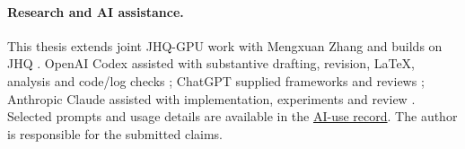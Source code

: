 \paragraph*{Research and AI assistance.}
\label{front:provenance}
This thesis extends joint JHQ-GPU work with Mengxuan Zhang
\cite{adc_artifact} and builds on JHQ \cite{jhq}.
OpenAI Codex assisted with substantive drafting, revision, LaTeX, analysis
and code/log checks \cite{ai_codex_record}; ChatGPT supplied frameworks
and reviews \cite{ai_chatgpt_record}; Anthropic Claude assisted with
implementation, experiments and review \cite{ai_claude_record}.
Selected prompts and usage details are available in the
\href{https://github.com/lrlorry/8800_report/blob/main/docs/ai-use-record.md}{AI-use record}.
The author is responsible for the submitted claims.
